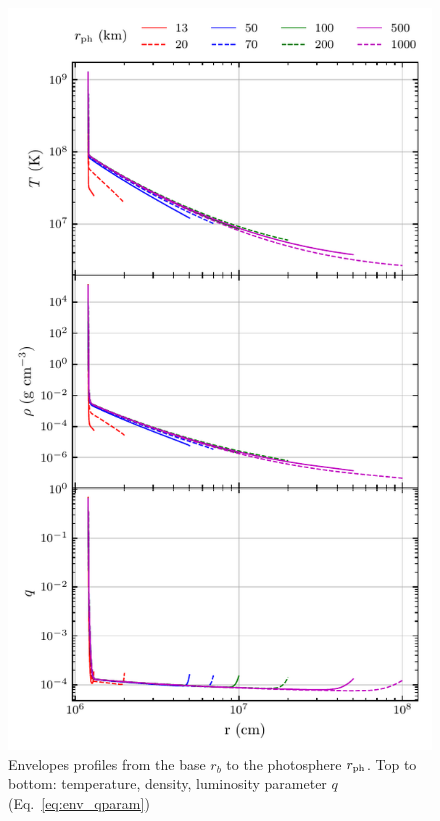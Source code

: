 \documentclass[../main.tex]{subfiles}
\begin{document}
\begin{figure}[H]
    \centering
    \includegraphics{figures/env_profiles.pdf}
    \caption[Envelope radial profiles]{Envelopes profiles from the base $r_b$ to the photosphere $r_\text{ph}$. Top to bottom: temperature, density, luminosity parameter $q$ (Eq.~\ref{eq:env_qparam})}
    \label{fig:env_profiles}
\end{figure}
\end{document}
